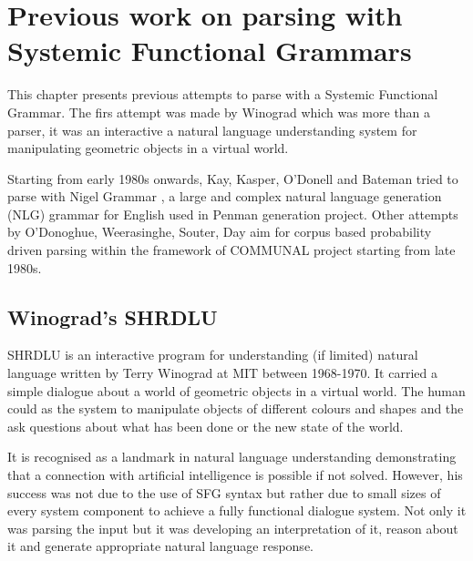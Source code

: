 \chapter{Previous work on parsing with Systemic Functional Grammars}
\label{ch:sota}
This chapter presents previous attempts to parse with a Systemic Functional Grammar. The firs attempt was made by Winograd \citep{Winograd1972} which was more than a parser, it was an interactive a natural language understanding system for manipulating geometric objects in a virtual world.

Starting from early 1980s onwards, Kay, Kasper, O'Donell and Bateman tried to parse with Nigel Grammar \citep{Matthiessen1985}, a large and complex natural language generation (NLG) grammar for English used in Penman generation project. Other attempts by O'Donoghue, Weerasinghe, Souter, Day aim for corpus based probability driven parsing within the framework of COMMUNAL project starting from late 1980s.  


\section{Winograd's SHRDLU}
SHRDLU is an interactive program for understanding (if limited) natural language written by Terry Winograd at MIT between 1968-1970. It carried a simple dialogue about a world of geometric objects in a virtual world. The human could as the system to manipulate objects of different colours and shapes and the ask questions about what has been done or the new state of the world. 

It is recognised as a landmark in natural language understanding demonstrating that a connection with artificial intelligence is possible if not solved. However, his success was not due to the use of SFG syntax but rather due to small sizes of every system component to achieve a fully functional dialogue system. Not only it was parsing the input but it was developing an interpretation of it, reason about it and generate appropriate natural language response. 

